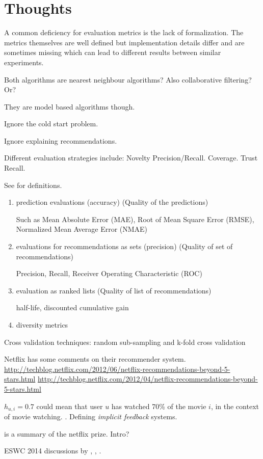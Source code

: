 \section{Thoughts}

A common deficiency for evaluation metrics is the lack of formalization. The metrics themselves are well defined but implementation details differ and are sometimes missing which can lead to different results between similar experiments.


Both algorithms are nearest neighbour algorithms? Also collaborative filtering? Or?

They are model based algorithms though.

Ignore the cold start problem.

Ignore explaining recommendations.

Different evaluation strategies include: Novelty Precision/Recall. Coverage. Trust Recall.

See \citep{bobadilla2013recommender} for definitions.

\begin{enumerate}
    \item prediction evaluations (accuracy) (Quality of the predictions)

        Such as Mean Absolute Error (MAE), Root of Mean Square Error (RMSE), Normalized Mean Average Error (NMAE)

    \item evaluations for recommendations as sets (precision) (Quality of set of recommendations)

        Precision, Recall, Receiver Operating Characteristic (ROC)

    \item evaluation as ranked lists (Quality of list of recommendations)

        half-life, discounted cumulative gain

    \item diversity metrics
\end{enumerate}

Cross validation techniques:
    random sub-sampling and k-fold cross validation

Netflix has some comments on their recommender system.
\url{http://techblog.netflix.com/2012/06/netflix-recommendations-beyond-5-stars.html}
\url{http://techblog.netflix.com/2012/04/netflix-recommendations-beyond-5-stars.html}

$h_{u, i} = 0.7$ could mean that user $u$ has watched 70\% of the movie $i$, in the context of movie watching. \citep{hu2008collaborative}. Defining \textit{implicit feedback} systems.

\citep{bennett2007netflix} is a summary of the netflix prize. Intro?

ESWC 2014 discussions by \citep{di2014linked}, \citep{heitmann2014semstim}, \citep{ostuni2014linked}.
